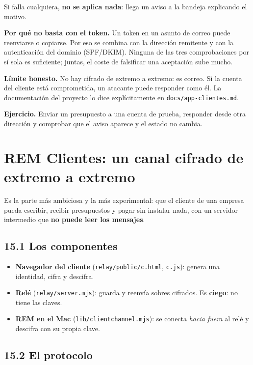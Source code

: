 Si falla cualquiera, \textbf{no se aplica nada}: llega un aviso a la bandeja explicando el motivo.

\textbf{Por qué no basta con el token.} Un token en un asunto de correo puede reenviarse o copiarse. Por eso se combina con la dirección remitente y con la autenticación del dominio (SPF/DKIM). Ninguna de las tres comprobaciones por sí sola es suficiente; juntas, el coste de falsificar una aceptación sube mucho.

\textbf{Límite honesto.} No hay cifrado de extremo a extremo: es correo. Si la cuenta del cliente está comprometida, un atacante puede responder como él. La documentación del proyecto lo dice explícitamente en \texttt{docs/app-clientes.md}.

\textbf{Ejercicio.} Enviar un presupuesto a una cuenta de prueba, responder desde otra dirección y comprobar que el aviso aparece y el estado no cambia.

\chapter{REM Clientes: un canal cifrado de extremo a extremo}\label{cap:remtec}\label{rem-clientes-un-canal-cifrado-de-extremo-a-extremo}

Es la parte más ambiciosa y la más experimental: que el cliente de una empresa pueda escribir, recibir presupuestos y pagar sin instalar nada, con un servidor intermedio que \textbf{no puede leer los mensajes}.

\section{15.1 Los componentes}\label{los-componentes}

\begin{itemize}
\tightlist
\item
  \textbf{Navegador del cliente} (\texttt{relay/public/c.html}, \texttt{c.js}): genera una identidad, cifra y descifra.
\item
  \textbf{Relé} (\texttt{relay/server.mjs}): guarda y reenvía sobres cifrados. Es \textbf{ciego}: no tiene las claves.
\item
  \textbf{REM en el Mac} (\texttt{lib/clientchannel.mjs}): se conecta \emph{hacia fuera} al relé y descifra con su propia clave.
\end{itemize}

\section{15.2 El protocolo}\label{el-protocolo}

